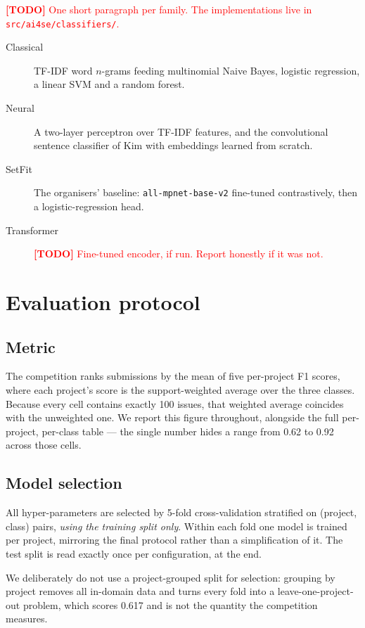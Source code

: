 \documentclass[10pt,a4paper]{article}
\newcommand{\todoitem}[1]{\textcolor{red}{\textbf{[TODO]} #1}}
\begin{document}
\todoitem{One short paragraph per family. The implementations live in
\texttt{src/ai4se/classifiers/}.}

\begin{description}
  \item[Classical] TF-IDF word $n$-grams feeding multinomial Naive Bayes,
        logistic regression, a linear SVM and a random forest.
  \item[Neural] A two-layer perceptron over TF-IDF features, and the
        convolutional sentence classifier of Kim with embeddings learned from
        scratch.
  \item[SetFit] The organisers' baseline: \texttt{all-mpnet-base-v2}
        fine-tuned contrastively, then a logistic-regression head.
  \item[Transformer] \todoitem{Fine-tuned encoder, if run. Report honestly if
        it was not.}
\end{description}

\section{Evaluation protocol}
\label{sec:protocol}

\subsection{Metric}

The competition ranks submissions by the mean of five per-project F1 scores,
where each project's score is the support-weighted average over the three
classes. Because every cell contains exactly 100 issues, that weighted average
coincides with the unweighted one. We report this figure throughout, alongside
the full per-project, per-class table --- the single number hides a range from
0.62 to 0.92 across those cells.

\subsection{Model selection}

All hyper-parameters are selected by 5-fold cross-validation stratified on
(project, class) pairs, \emph{using the training split only}. Within each fold
one model is trained per project, mirroring the final protocol rather than a
simplification of it. The test split is read exactly once per configuration,
at the end.

We deliberately do not use a project-grouped split for selection: grouping by
project removes all in-domain data and turns every fold into a
leave-one-project-out problem, which scores 0.617 and is not the quantity the
competition measures.
\end{document}
